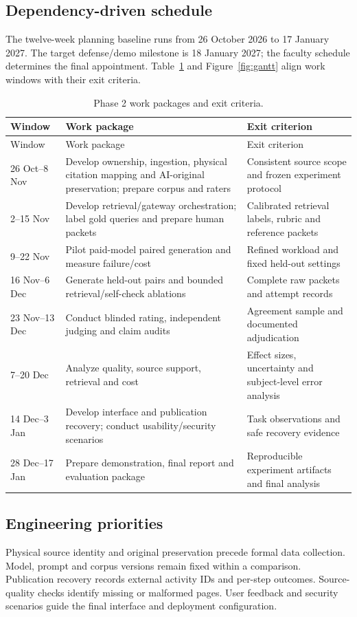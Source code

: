 \subsection{Dependency-driven schedule}
The twelve-week planning baseline runs from 26 October 2026 to 17 January 2027. The target defense/demo milestone is 18 January 2027; the faculty schedule determines the final appointment. Table~\ref{tab:schedule} and Figure~\ref{fig:gantt} align work windows with their exit criteria.
\begin{longtable}{|p{2.0cm}|p{6.9cm}|p{5.0cm}|}\caption{Phase 2 work packages and exit criteria.}\label{tab:schedule}\\\hline
Window & Work package & Exit criterion\\\hline\endfirsthead
\hline Window & Work package & Exit criterion\\\hline\endhead
26 Oct--8 Nov & Develop ownership, ingestion, physical citation mapping and AI-original preservation; prepare corpus and raters & Consistent source scope and frozen experiment protocol\\\hline
2--15 Nov & Develop retrieval/gateway orchestration; label gold queries and prepare human packets & Calibrated retrieval labels, rubric and reference packets\\\hline
9--22 Nov & Pilot paid-model paired generation and measure failure/cost & Refined workload and fixed held-out settings\\\hline
16 Nov--6 Dec & Generate held-out pairs and bounded retrieval/self-check ablations & Complete raw packets and attempt records\\\hline
23 Nov--13 Dec & Conduct blinded rating, independent judging and claim audits & Agreement sample and documented adjudication\\\hline
7--20 Dec & Analyze quality, source support, retrieval and cost & Effect sizes, uncertainty and subject-level error analysis\\\hline
14 Dec--3 Jan & Develop interface and publication recovery; conduct usability/security scenarios & Task observations and safe recovery evidence\\\hline
28 Dec--17 Jan & Prepare demonstration, final report and evaluation package & Reproducible experiment artifacts and final analysis\\\hline
\end{longtable}
\subsection{Engineering priorities}
Physical source identity and original preservation precede formal data collection. Model, prompt and corpus versions remain fixed within a comparison. Publication recovery records external activity IDs and per-step outcomes. Source-quality checks identify missing or malformed pages. User feedback and security scenarios guide the final interface and deployment configuration.

